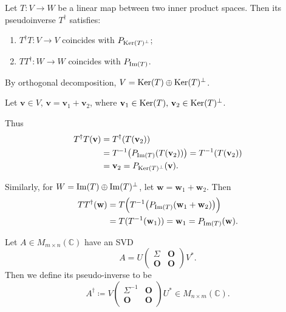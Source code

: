 \begin{theorem}
Let $T:V\rightarrow W$ be a linear map between two inner product spaces.
Then its pseudoinverse $T^\dagger$ satisfies:
\begin{enumerate}
    \item $T^\dagger T:V\rightarrow V$ coincides with
    $P_{\operatorname{Ker}(T)^\perp}$;
    \item $TT^\dagger:W\rightarrow W$ coincides with
    $P_{\operatorname{Im}(T)}$.
\end{enumerate}
\end{theorem}

\begin{pfbox}
By orthogonal decomposition, $V=\operatorname{Ker}(T)\oplus \operatorname{Ker}(T)^\perp$.

Let $\mathbf{v}\in V$, $\mathbf{v}=\mathbf{v}_1+\mathbf{v}_2$,
where $\mathbf{v}_1\in \operatorname{Ker}(T),\,\mathbf{v}_2\in \operatorname{Ker}(T)^\perp$.

Thus
\begin{align*}
T^\dagger T(\mathbf{v}) &= T^\dagger(T(\mathbf{v}_2)) \\
&=T^{-1}\bigl(P_{\operatorname{Im}(T)}(T(\mathbf{v}_2))\bigr) = T^{-1}(T(\mathbf{v}_2))\\
&= \mathbf{v}_2 = P_{\operatorname{Ker}(T)^\perp}(\mathbf{v}).
\end{align*}

Similarly, for $W=\operatorname{Im}(T)\oplus \operatorname{Im}(T)^\perp$, 
let $\mathbf{w}=\mathbf{w}_1+\mathbf{w}_2$.
Then
\begin{align*}
TT^\dagger(\mathbf{w})
&= T\Bigl(T^{-1}\bigl(P_{\operatorname{Im}(T)}(\mathbf{w}_1+\mathbf{w}_2)\bigr)\Bigr) \\
&=T(T^{-1}(\mathbf{w}_1)) = \mathbf{w}_1 = P_{\operatorname{Im}(T)}(\mathbf{w}).
\end{align*}
\end{pfbox}


\begin{definition}
Let $A\in M_{m\times n}(\mathbb{C})$ have an SVD
\[
A=
U
\begin{pmatrix}
\Sigma & \mathbf{O} \\
\mathbf{O} & \mathbf{O}
\end{pmatrix}
V^*.
\]
Then we define its pseudo-inverse to be
\[
A^\dagger
\coloneqq
V
\begin{pmatrix}
\Sigma^{-1} & \mathbf{O} \\
\mathbf{O} & \mathbf{O}
\end{pmatrix}
U^*
\in
M_{n\times m}(\mathbb{C}).
\]
\end{definition}

